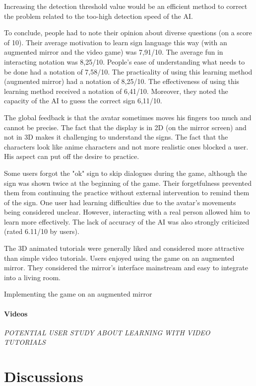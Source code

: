 Increasing the detection threshold value would be an efficient method to correct the problem related to the too-high detection speed of the AI.

To conclude, people had to note their opinion about diverse questions (on a score of 10). Their average motivation to learn sign language this way (with an augmented mirror and the video game) was 7,91/10.
The average fun in interacting notation was 8,25/10. People's ease of understanding what needs to be done had a notation of 7,58/10. The practicality of using this learning method (augmented mirror) had a notation of 8,25/10. The effectiveness of using this learning method received a notation of 6,41/10. Moreover, they noted the capacity of the AI to guess the correct sign 6,11/10.

The global feedback is that the avatar sometimes moves his fingers too much and cannot be precise. The fact that the display is in 2D (on the mirror screen) and not in 3D makes it challenging to understand the signs.
The fact that the characters look like anime characters and not more realistic ones blocked a user. His aspect can put off the desire to practice.

Some users forgot the "ok" sign to skip dialogues during the game, although the sign was shown twice at the beginning of the game. Their forgetfulness prevented them from continuing the practice without external intervention to remind them of the sign. 
One user had learning difficulties due to the avatar's movements being considered unclear. However, interacting with a real person allowed him to learn more effectively. The lack of accuracy of the AI was also strongly criticized (rated 6.11/10 by users). 

The 3D animated tutorials were generally liked and considered more attractive than simple video tutorials. Users enjoyed using the game on an augmented mirror. They considered the mirror's interface mainstream and easy to integrate into a living room.

Implementing the game on an augmented mirror


\paragraph{Videos}

\textit{POTENTIAL USER STUDY ABOUT LEARNING WITH VIDEO TUTORIALS}

\section{Discussions}

